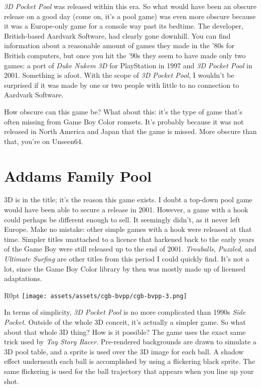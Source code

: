 \documentclass{book}
\begin{document}
\emph{3D Pocket Pool} was released within this era. So what would have been an obscure release on a good day (come on, it’s a pool game) was even more obscure because it was a Europe-only game for a console way past its bedtime. The developer, British-based Aardvark Software, had clearly gone downhill. You can find information about a reasonable amount of games they made in the ’80s for British computers, but once you hit the ’90s they seem to have made only two games: a port of \emph{Duke Nukem 3D} for PlayStation in 1997 and \emph{3D Pocket Pool} in 2001. Something is afoot. With the scope of \emph{3D Pocket Pool}, I wouldn’t be surprised if it was made by one or two people with little to no connection to Aardvark Software.

How obscure can this game be? What about this: it’s the type of game that’s often missing from Game Boy Color romsets. It’s probably because it was not released in North America and Japan that the game is missed. More obscure than that, you’re on Unseen64.

\FloatBarrier\needspace{10mm}\section*{Addams Family Pool}\nopagebreak[4]

3D is in the title; it’s the reason this game exists. I doubt a top-down pool game would have been able to secure a release in 2001. However, a game with a hook could perhaps be different enough to sell. It seemingly didn’t, as it never left Europe. Make no mistake: other simple games with a hook were released at that time. Simpler titles unattached to a licence that harkened back to the early years of the Game Boy were still released up to the end of 2001. \emph{Trouballs}, \emph{Puzzled}, and \emph{Ultimate Surfing} are other titles from this period I could quickly find. It’s not a lot, since the Game Boy Color library by then was mostly made up of licensed adaptations.

\begin{wrapfigure}{R}{0pt} \texttt{[image: assets/assets/cgb-bvpp/cgb-bvpp-3.png]}\end{wrapfigure}
In terms of simplicity, \emph{3D Pocket Pool} is no more complicated than 1990s \emph{Side Pocket}. Outside of the whole 3D conceit, it’s actually a simpler game. So what about that whole 3D thing? How is it possible? The game uses the exact same trick used by \emph{Toy Story Racer}. Pre-rendered backgrounds are drawn to simulate a 3D pool table, and a sprite is used over the 3D image for each ball. A shadow effect underneath each ball is accomplished by using a flickering black sprite. The same flickering is used for the ball trajectory that appears when you line up your shot.
\end{document}
